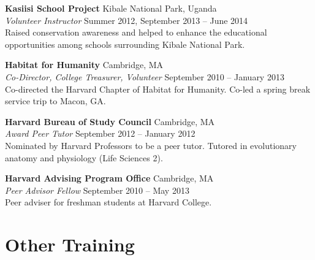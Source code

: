 \documentclass[11pt,letterpaper]{article}
\newcommand{\entry}[4]{%
  \textbf{#1} \hfill #2 \\
  \textit{#3} \hfill #4 \\[2pt]
}
\begin{document}
\vspace{6pt}

\entry{Kasiisi School Project}{Kibale National Park, Uganda}{Volunteer Instructor}{Summer 2012, September 2013 -- June 2014}
Raised conservation awareness and helped to enhance the educational opportunities among schools surrounding Kibale National Park.

\vspace{6pt}

\entry{Habitat for Humanity}{Cambridge, MA}{Co-Director, College Treasurer, Volunteer}{September 2010 -- January 2013}
Co-directed the Harvard Chapter of Habitat for Humanity. Co-led a spring break service trip to Macon, GA.

\vspace{6pt}

\entry{Harvard Bureau of Study Council}{Cambridge, MA}{Award Peer Tutor}{September 2012 -- January 2012}
Nominated by Harvard Professors to be a peer tutor. Tutored in evolutionary anatomy and physiology (Life Sciences 2).

\vspace{6pt}

\entry{Harvard Advising Program Office}{Cambridge, MA}{Peer Advisor Fellow}{September 2010 -- May 2013}
Peer adviser for freshman students at Harvard College.

\vspace{18pt}

\section{Other Training}
\end{document}
